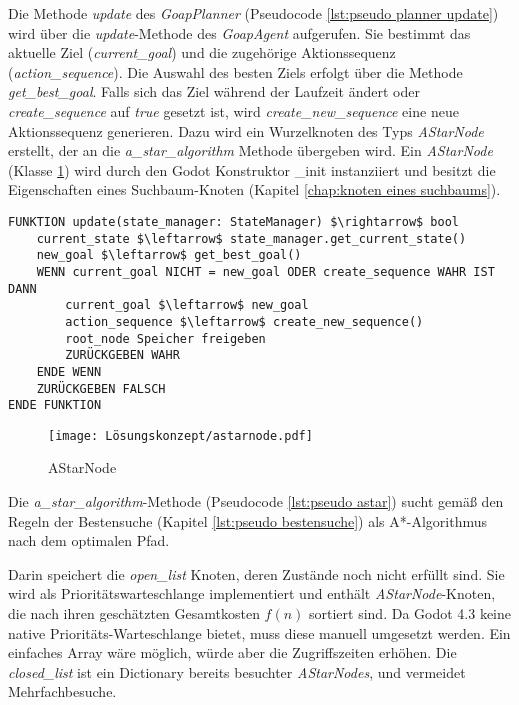 Die Methode \textit{update} des \textit{GoapPlanner} (Pseudocode \ref{lst:pseudo planner update}) wird über die \textit{update}-Methode des \textit{GoapAgent} aufgerufen. Sie bestimmt das aktuelle Ziel (\textit{current\_goal}) und die zugehörige Aktionssequenz (\textit{action\_sequence}). Die Auswahl des besten Ziels erfolgt über die Methode \textit{get\_best\_goal}. Falls sich das Ziel während der Laufzeit ändert oder \textit{create\_sequence} auf \textit{true} gesetzt ist, wird \textit{create_new\_sequence} eine neue Aktionssequenz generieren. Dazu wird ein Wurzelknoten des Typs \textit{AStarNode} erstellt, der an die \textit{a\_star\_algorithm} Methode übergeben wird. Ein \textit{AStarNode} (Klasse \ref{fig:AStarNode}) wird durch den Godot Konstruktor \_init instanziiert und besitzt die Eigenschaften eines Suchbaum-Knoten (Kapitel \ref{chap:knoten eines suchbaums}).

\begin{lstlisting}[language=Pseudo, caption={update Methode des GoapAgent}, mathescape=true, label={lst:pseudo planner update}]
FUNKTION update(state_manager: StateManager) $\rightarrow$ bool
    current_state $\leftarrow$ state_manager.get_current_state()
    new_goal $\leftarrow$ get_best_goal()
    WENN current_goal NICHT = new_goal ODER create_sequence WAHR IST DANN
        current_goal $\leftarrow$ new_goal
        action_sequence $\leftarrow$ create_new_sequence()
        root_node Speicher freigeben
        ZURÜCKGEBEN WAHR
    ENDE WENN
    ZURÜCKGEBEN FALSCH
ENDE FUNKTION
\end{lstlisting}

\begin{figure}[h]
  \centering
  \texttt{[image: Lösungskonzept/astarnode.pdf]}
	\captionsetup{justification=justified, format=plain}
  \caption{AStarNode}
  \label{fig:AStarNode}
\end{figure}

Die \textit{a\_star\_algorithm}-Methode (Pseudocode \ref{lst:pseudo astar}) sucht gemäß den Regeln der Bestensuche (Kapitel \ref{lst:pseudo bestensuche}) als A*-Algorithmus nach dem optimalen Pfad.

Darin speichert die \textit{open\_list} Knoten, deren Zustände noch nicht erfüllt sind. Sie wird als Prioritätswarteschlange implementiert und enthält \textit{AStarNode}-Knoten, die nach ihren geschätzten Gesamtkosten $f(n)$ sortiert sind. Da Godot 4.3 keine native Prioritäts-Warteschlange bietet, muss diese manuell umgesetzt werden. Ein einfaches Array wäre möglich, würde aber die Zugriffszeiten erhöhen. Die \textit{closed\_list} ist ein Dictionary bereits besuchter \textit{AStarNodes}, und vermeidet Mehrfachbesuche. 

